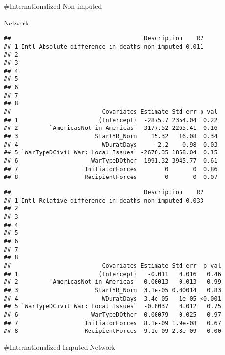 \documentclass[
]{article}
\begin{document}
\#Internationalized Non-imputed

Network

\begin{verbatim}
##                                      Description    R2
## 1 Intl Absolute difference in deaths non-imputed 0.011
## 2                                                     
## 3                                                     
## 4                                                     
## 5                                                     
## 6                                                     
## 7                                                     
## 8                                                     
##                          Covariates Estimate Std err p-val
## 1                       (Intercept)  -2875.7 2354.04  0.22
## 2         `AmericasNot in Americas`  3177.52 2265.41  0.16
## 3                      StartYR_Norm    15.32   16.08  0.34
## 4                        WDuratDays     -2.2    0.98  0.03
## 5 `WarTypeDCivil War: Local Issues` -2670.35 1858.04  0.15
## 6                     WarTypeDOther -1991.32 3945.77  0.61
## 7                   InitiatorForces        0       0  0.86
## 8                   RecipientForces        0       0  0.07
\end{verbatim}

\begin{verbatim}
##                                      Description    R2
## 1 Intl Relative difference in deaths non-imputed 0.033
## 2                                                     
## 3                                                     
## 4                                                     
## 5                                                     
## 6                                                     
## 7                                                     
## 8                                                     
##                          Covariates Estimate Std err  p-val
## 1                       (Intercept)   -0.011   0.016   0.46
## 2         `AmericasNot in Americas`  0.00013   0.013   0.99
## 3                      StartYR_Norm  3.1e-05 0.00014   0.83
## 4                        WDuratDays  3.4e-05   1e-05 <0.001
## 5 `WarTypeDCivil War: Local Issues`  -0.0037   0.012   0.75
## 6                     WarTypeDOther  0.00079   0.025   0.97
## 7                   InitiatorForces  8.1e-09 1.9e-08   0.67
## 8                   RecipientForces  9.1e-09 2.8e-09   0.00
\end{verbatim}

\#Internationalized Imputed Network
\end{document}
